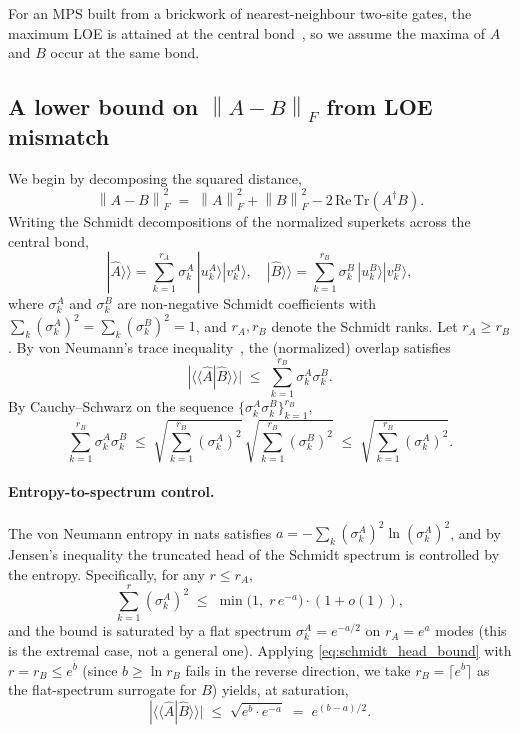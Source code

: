 \documentclass[%
 reprint,
superscriptaddress,
 amsmath,amssymb,
 aps,
]{revtex4-2}
\newcommand{\norm}[1]{\left\lVert#1\right\rVert}
\begin{document}
For an MPS built from a brickwork of nearest-neighbour two-site gates, the maximum LOE is attained at the central bond~\cite{schollwoeck2011DMRG}, so we assume the maxima of $A$ and $B$ occur at the same bond.

\subsection{A lower bound on $\norm{A-B}_F$ from LOE mismatch}

We begin by decomposing the squared distance,
\begin{equation}
    \norm{A-B}_F^2 \;=\; \norm{A}_F^2 + \norm{B}_F^2 - 2\,\mathrm{Re}\,\mathrm{Tr}(A^\dagger B).
    \label{eq:decomposition_AB}
\end{equation}
Writing the Schmidt decompositions of the normalized superkets across the central bond,
\begin{equation}
    |\hat A\rangle\rangle = \sum_{k=1}^{r_A} \sigma_k^A\,|u_k^A\rangle|v_k^A\rangle,\quad |\hat B\rangle\rangle = \sum_{k=1}^{r_B}\sigma_k^B\,|u_k^B\rangle|v_k^B\rangle,
\end{equation}
where $\sigma_k^{A}$ and $\sigma_k^{B}$ are non-negative Schmidt coefficients with $\sum_k (\sigma_k^A)^2 = \sum_k (\sigma_k^B)^2 = 1$, and $r_A, r_B$ denote the Schmidt ranks. Let $r_A\ge r_B$. By von Neumann's trace inequality~\cite{mirsky1975trace}, the (normalized) overlap satisfies
\begin{equation}
    |\langle\langle \hat A|\hat B\rangle\rangle| \;\le\; \sum_{k=1}^{r_B}\sigma_k^A\sigma_k^B.
\end{equation}
By Cauchy--Schwarz on the sequence $\{\sigma_k^A\sigma_k^B\}_{k=1}^{r_B}$,
\begin{equation}
    \sum_{k=1}^{r_B}\sigma_k^A\sigma_k^B \;\le\; \sqrt{\sum_{k=1}^{r_B}(\sigma_k^A)^2}\,\sqrt{\sum_{k=1}^{r_B}(\sigma_k^B)^2} \;\le\; \sqrt{\sum_{k=1}^{r_B}(\sigma_k^A)^2}.
    \label{eq:overlap_CS}
\end{equation}

\paragraph*{Entropy-to-spectrum control.} The von Neumann entropy in nats satisfies $a=-\sum_k (\sigma_k^A)^2\ln(\sigma_k^A)^2$, and by Jensen's inequality the truncated head of the Schmidt spectrum is controlled by the entropy. Specifically, for any $r\le r_A$,
\begin{equation}
    \sum_{k=1}^{r}(\sigma_k^A)^2 \;\le\; \min\!\bigl(1,\; r\,e^{-a}\bigr)\cdot(1+o(1)),
    \label{eq:schmidt_head_bound}
\end{equation}
and the bound is saturated by a flat spectrum $\sigma_k^A = e^{-a/2}$ on $r_A=e^a$ modes (this is the extremal case, not a general one). Applying \eqref{eq:schmidt_head_bound} with $r=r_B\le e^b$ (since $b\ge\ln r_B$ fails in the reverse direction, we take $r_B = \lceil e^b\rceil$ as the flat-spectrum surrogate for $B$) yields, at saturation,
\begin{equation}
    |\langle\langle \hat A|\hat B\rangle\rangle| \;\le\; \sqrt{e^{b}\cdot e^{-a}} \;=\; e^{(b-a)/2}.
    \label{eq:overlap_bound_flat}
\end{equation}
\end{document}
